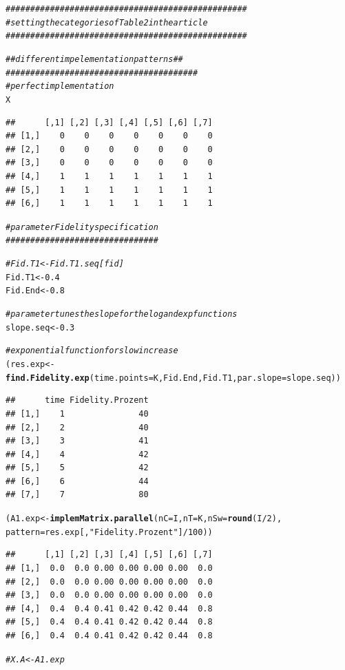 \documentclass{article}\usepackage[]{graphicx}\usepackage[]{color}
\makeatletter
\newcommand{\hlnum}[1]{\textcolor[rgb]{0.686,0.059,0.569}{#1}}%
\newcommand{\hlstr}[1]{\textcolor[rgb]{0.192,0.494,0.8}{#1}}%
\newcommand{\hlcom}[1]{\textcolor[rgb]{0.678,0.584,0.686}{\textit{#1}}}%
\newcommand{\hlopt}[1]{\textcolor[rgb]{0,0,0}{#1}}%
\newcommand{\hlstd}[1]{\textcolor[rgb]{0.345,0.345,0.345}{#1}}%
\newcommand{\hlkwb}[1]{\textcolor[rgb]{0.69,0.353,0.396}{#1}}%
\newcommand{\hlkwc}[1]{\textcolor[rgb]{0.333,0.667,0.333}{#1}}%
\newcommand{\hlkwd}[1]{\textcolor[rgb]{0.737,0.353,0.396}{\textbf{#1}}}%
\newenvironment{kframe}{%
 \def\at@end@of@kframe{}%
 \ifinner\ifhmode%
  \def\at@end@of@kframe{\end{minipage}}%
  \begin{minipage}{\columnwidth}%
 \fi\fi%
 \def\FrameCommand##1{\hskip\@totalleftmargin \hskip-\fboxsep
 \colorbox{shadecolor}{##1}\hskip-\fboxsep
     \hskip-\linewidth \hskip-\@totalleftmargin \hskip\columnwidth}%
 \MakeFramed {\advance\hsize-\width
   \@totalleftmargin\z@ \linewidth\hsize
   \@setminipage}}%
 {\par\unskip\endMakeFramed%
 \at@end@of@kframe}
\newenvironment{knitrout}{}{} %
\makeatother
\begin{document}
\begin{knitrout}
\color{fgcolor}\begin{kframe}
\begin{alltt}
\hlcom{#################################################}
\hlcom{#setting the categories of Table 2 in the article}
\hlcom{#################################################}

\hlcom{## different impelementation patterns ##}
\hlcom{#######################################}
\hlcom{# perfect implementation}
\hlstd{X}
\end{alltt}
\begin{verbatim}
##      [,1] [,2] [,3] [,4] [,5] [,6] [,7]
## [1,]    0    0    0    0    0    0    0
## [2,]    0    0    0    0    0    0    0
## [3,]    0    0    0    0    0    0    0
## [4,]    1    1    1    1    1    1    1
## [5,]    1    1    1    1    1    1    1
## [6,]    1    1    1    1    1    1    1
\end{verbatim}
\begin{alltt}
\hlcom{#parameter Fidelity specification}
\hlcom{###############################}

\hlcom{#Fid.T1<-Fid.T1.seq[fid]}
\hlstd{Fid.T1}\hlkwb{<-}\hlnum{0.4}
\hlstd{Fid.End}\hlkwb{<-}\hlnum{0.8}

\hlcom{#parameter tunes the slope for the log and exp functions}
\hlstd{slope.seq}\hlkwb{<-}\hlnum{0.3}

\hlcom{#exponential function for slow increase}
\hlstd{(res.exp}\hlkwb{<-}\hlkwd{find.Fidelity.exp}\hlstd{(}\hlkwc{time.points}\hlstd{=K, Fid.End, Fid.T1,} \hlkwc{par.slope}\hlstd{=slope.seq))}
\end{alltt}
\begin{verbatim}
##      time Fidelity.Prozent
## [1,]    1               40
## [2,]    2               40
## [3,]    3               41
## [4,]    4               42
## [5,]    5               42
## [6,]    6               44
## [7,]    7               80
\end{verbatim}
\begin{alltt}
\hlstd{(A1.exp} \hlkwb{<-}\hlkwd{implemMatrix.parallel}\hlstd{(}\hlkwc{nC}\hlstd{=I,} \hlkwc{nT}\hlstd{=K,} \hlkwc{nSw}\hlstd{=}\hlkwd{round}\hlstd{(I}\hlopt{/}\hlnum{2}\hlstd{),}
                                \hlkwc{pattern}\hlstd{=res.exp[,}\hlstr{"Fidelity.Prozent"}\hlstd{]}\hlopt{/}\hlnum{100}\hlstd{))}
\end{alltt}
\begin{verbatim}
##      [,1] [,2] [,3] [,4] [,5] [,6] [,7]
## [1,]  0.0  0.0 0.00 0.00 0.00 0.00  0.0
## [2,]  0.0  0.0 0.00 0.00 0.00 0.00  0.0
## [3,]  0.0  0.0 0.00 0.00 0.00 0.00  0.0
## [4,]  0.4  0.4 0.41 0.42 0.42 0.44  0.8
## [5,]  0.4  0.4 0.41 0.42 0.42 0.44  0.8
## [6,]  0.4  0.4 0.41 0.42 0.42 0.44  0.8
\end{verbatim}
\begin{alltt}
\hlcom{#X.A<-A1.exp}


\end{alltt}
\end{kframe}
\end{knitrout}
\end{document}
